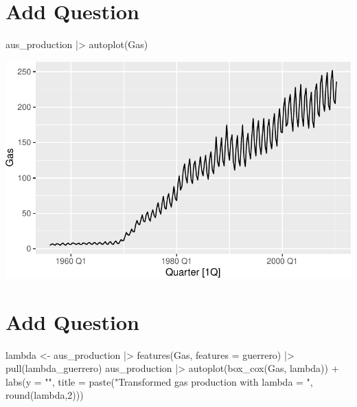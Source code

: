 \documentclass[
  letterpaper,
  DIV=11,
  numbers=noendperiod]{scrartcl}
\newenvironment{Shaded}{\begin{snugshade}}{\end{snugshade}}
\newcommand{\AttributeTok}[1]{\textcolor[rgb]{0.40,0.45,0.13}{#1}}
\newcommand{\DecValTok}[1]{\textcolor[rgb]{0.68,0.00,0.00}{#1}}
\newcommand{\FunctionTok}[1]{\textcolor[rgb]{0.28,0.35,0.67}{#1}}
\newcommand{\NormalTok}[1]{\textcolor[rgb]{0.00,0.23,0.31}{#1}}
\newcommand{\OtherTok}[1]{\textcolor[rgb]{0.00,0.23,0.31}{#1}}
\newcommand{\SpecialCharTok}[1]{\textcolor[rgb]{0.37,0.37,0.37}{#1}}
\newcommand{\StringTok}[1]{\textcolor[rgb]{0.13,0.47,0.30}{#1}}
\begin{document}
\section{Add Question}\label{add-question-2}

\begin{Shaded}
\begin{Highlighting}[]
\NormalTok{aus\_production }\SpecialCharTok{|\textgreater{}}
\FunctionTok{autoplot}\NormalTok{(Gas)}
\end{Highlighting}
\end{Shaded}

\includegraphics{HW2_IBM6520_files/figure-pdf/unnamed-chunk-4-1.pdf}

\section{Add Question}\label{add-question-3}

\begin{Shaded}
\begin{Highlighting}[]
\NormalTok{lambda }\OtherTok{\textless{}{-}}\NormalTok{ aus\_production }\SpecialCharTok{|\textgreater{}}
\FunctionTok{features}\NormalTok{(Gas, }\AttributeTok{features =}\NormalTok{ guerrero) }\SpecialCharTok{|\textgreater{}}
\FunctionTok{pull}\NormalTok{(lambda\_guerrero)}
\NormalTok{aus\_production }\SpecialCharTok{|\textgreater{}}
\FunctionTok{autoplot}\NormalTok{(}\FunctionTok{box\_cox}\NormalTok{(Gas, lambda)) }\SpecialCharTok{+}
\FunctionTok{labs}\NormalTok{(}\AttributeTok{y =} \StringTok{""}\NormalTok{,}
\AttributeTok{title =} \FunctionTok{paste}\NormalTok{(}\StringTok{"Transformed gas production with lambda = "}\NormalTok{, }\FunctionTok{round}\NormalTok{(lambda,}\DecValTok{2}\NormalTok{)))}
\end{Highlighting}
\end{Shaded}
\end{document}

